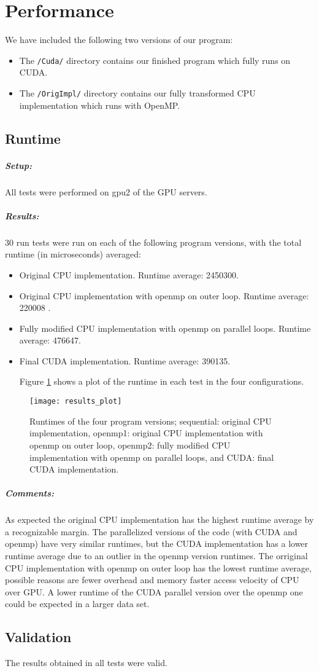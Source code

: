 \section{Performance}
We have included the following two versions of our program:
\begin{itemize}
\item The \verb!/Cuda/! directory contains our finished program which fully runs on CUDA.
\item The \verb!/OrigImpl/! directory contains our fully transformed CPU implementation which runs with OpenMP.
\end{itemize}
\subsection{Runtime}
\subparagraph{Setup:} All tests were performed on gpu2 of the GPU servers.


\subparagraph{Results:} 

30 run tests were run on each of the following program versions, with the total runtime (in microseconds) averaged:
\begin{itemize}
\item Original CPU implementation. Runtime average: 2450300.
\item Original CPU implementation with openmp on outer loop. Runtime average: 220008 .
\item Fully modified CPU implementation with openmp on parallel loops. Runtime average: 476647.
\item Final CUDA implementation. Runtime average: 390135.

Figure \ref{fig_res} shows a plot of the runtime in each test in the four configurations.
\end{itemize}
\begin{figure}[H]
\texttt{[image: results\_plot]} 
\caption{Runtimes of the four program versions; sequential: original CPU implementation, openmp1: original CPU implementation with openmp on outer loop, openmp2: fully modified CPU implementation with openmp on parallel loops, and CUDA: final CUDA implementation.}
\label{fig_res}
\end{figure}



\subparagraph{Comments:} As expected the original CPU implementation has the highest runtime average by a recognizable margin. The parallelized versions of the code (with CUDA and openmp) have very similar runtimes, but the CUDA implementation has a lower runtime average due to an outlier in the openmp version runtimes. The orriginal CPU implementation with openmp on outer loop has the lowest runtime average, possible reasons are fewer overhead and memory faster access velocity of CPU over GPU. A lower runtime of the CUDA parallel version over the openmp one could be expected in a larger data set.

\subsection{Validation}
The results obtained in all tests were valid.
